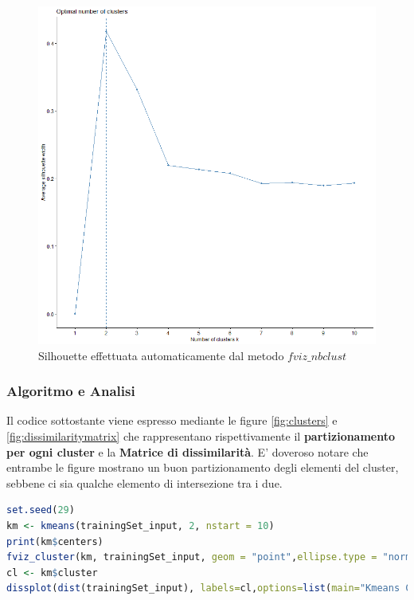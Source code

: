 \documentclass[letterpaper,11pt]{article}
\begin{document}
\begin{figure}[!htb]
\begin{minipage}{0.48\textwidth}
     \includegraphics[width=1\linewidth]{Img/K-MEANS/KMEANS004.png}
     \caption{Silhouette effettuata automaticamente dal metodo $fviz\_nbclust$}\label{fig:Silhouette2}
   \end{minipage}
\end{figure}
\subsubsection{Algoritmo e Analisi}
Il codice sottostante viene espresso mediante le figure  \ref{fig:clusters} e \ref{fig:dissimilaritymatrix} che rappresentano rispettivamente il \textbf{partizionamento per ogni cluster} e la \textbf{Matrice di dissimilarità}. E' doveroso notare che entrambe le figure mostrano un buon partizionamento degli elementi del cluster, sebbene ci sia qualche elemento di intersezione tra i due.
\begin{lstlisting}[language=R]
set.seed(29)
km <- kmeans(trainingSet_input, 2, nstart = 10)
print(km$centers)
fviz_cluster(km, trainingSet_input, geom = "point",ellipse.type = "norm",repel = TRUE)
cl <- km$cluster
dissplot(dist(trainingSet_input), labels=cl,options=list(main="Kmeans Clustering With k=2"))
\end{lstlisting}
\end{document}
